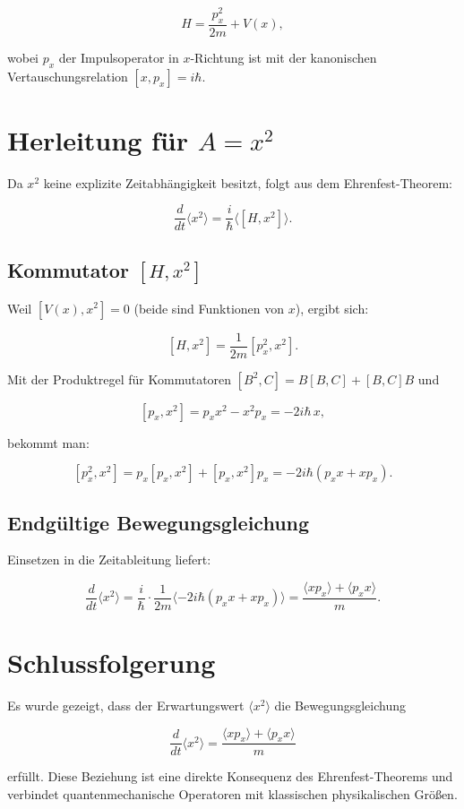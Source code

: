 \documentclass[a4paper,12pt]{article}
\begin{document}
$$
  H = \frac{p_x^2}{2m} + V(x),
$$

wobei $p_x$ der Impulsoperator in $x$-Richtung ist mit der kanonischen Vertauschungsrelation $[x, p_x] = i\hbar$.

\section{Herleitung für $A = x^2$}
Da $x^2$ keine explizite Zeitabhängigkeit besitzt, folgt aus dem Ehrenfest-Theorem:

$$
  \frac{d}{dt} \langle x^2 \rangle = \frac{i}{\hbar} \langle [H, x^2] \rangle.
$$

\subsection{Kommutator $[H, x^2]$}
Weil $[V(x), x^2] = 0$ (beide sind Funktionen von $x$), ergibt sich:

$$
  [H, x^2] = \frac{1}{2m} [p_x^2, x^2].
$$

Mit der Produktregel für Kommutatoren $[B^2, C] = B[B,C] + [B,C]B$ und

$$
  [p_x, x^2] = p_x x^2 - x^2 p_x = -2i\hbar \, x,
$$

bekommt man:

$$
  [p_x^2, x^2] = p_x [p_x, x^2] + [p_x, x^2] p_x = -2i\hbar (p_x x + x p_x).
$$

\subsection{Endgültige Bewegungsgleichung}
Einsetzen in die Zeitableitung liefert:

$$
  \frac{d}{dt} \langle x^2 \rangle
  = \frac{i}{\hbar} \cdot \frac{1}{2m} \langle -2i\hbar (p_x x + x p_x) \rangle
  = \frac{\langle x p_x \rangle + \langle p_x x \rangle}{m}.
$$

\section*{Schlussfolgerung}
Es wurde gezeigt, dass der Erwartungswert $\langle x^2 \rangle$ die Bewegungsgleichung

$$
  \frac{d}{dt} \langle x^2 \rangle = \frac{\langle x p_x \rangle + \langle p_x x \rangle}{m}
$$

erfüllt. Diese Beziehung ist eine direkte Konsequenz des Ehrenfest-Theorems und verbindet quantenmechanische Operatoren mit klassischen physikalischen Größen.
\end{document}
